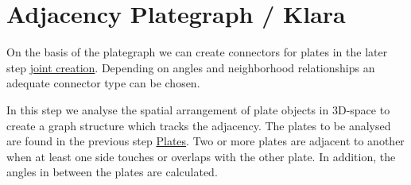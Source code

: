 \documentclass[../ClassicThesis.tex]{subfiles}
\begin{document}
\chapter{Adjacency Plategraph / Klara}\label{ch:graph}
\newcommand{\TODO}[1]{\textcolor{red}{\\ \textbf{TODO:} #1 \\}}





On the basis of the plategraph we can create connectors for plates in the later step \hyperref[ch:joints]{joint creation}. Depending on angles and neighborhood relationships an adequate connector type can be chosen.

In this step we analyse the spatial arrangement of plate objects in 3D-space to create a graph structure which tracks the adjacency. The plates to be analysed are found in the previous step \hyperref[ch:plates]{Plates}. Two or more plates are adjacent to another when at least one side touches or overlaps with the other plate. In addition, the angles in between the plates are calculated.
\end{document}
